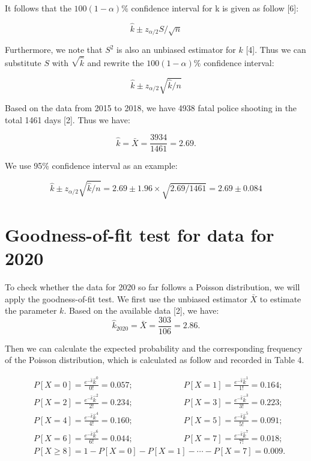 \documentclass[a4paper]{article}
\begin{document}
	It follows that the $100(1-\alpha)\%$ confidence interval for k is given as follow [6]:
	
	$$\hat{k}\pm z_{\alpha/2}S/\sqrt{n}$$
	
	Furthermore, we note that $S^2$ is also an unbiased estimator for $k$ [4]. Thus we can substitute $S$ with $\sqrt{\hat{k}}$ and rewrite the $100(1-\alpha)\%$ confidence interval:
	
	$$\hat{k}\pm z_{\alpha/2}\sqrt{\hat{k}/n}$$
	
	Based on the data from 2015 to 2018, we have 4938 fatal police shooting in the total 1461 days [2]. Thus we have:
	
	\begin{equation}
	\hat{k}=\bar{X}=\frac{3934}{1461}=2.69.
	\end{equation}

	We use 95\% confidence interval as an example:
	
	$$\hat{k}\pm z_{\alpha/2}\sqrt{\hat{k}/n}=2.69\pm1.96\times\sqrt{2.69/1461}=2.69\pm0.084$$
	
\section{Goodness-of-fit test for data for 2020}

    To check whether the data for 2020 so far follows a Poisson distribution, we will apply the goodness-of-fit test. We first use the unbiased estimator $\bar{X}$ to estimate the parameter $k$.
    Based on the available data [2], we have:
    \begin{equation}
    \hat{k}_{2020}=\bar{X}=\frac{303}{106}=2.86.
    \end{equation}
    
    Then we can calculate the expected probability and the corresponding frequency of the Poisson distribution, which is calculated as follow and recorded in Table 4. 
    
\begin{equation}
\begin{split}
&P[X=0]=\frac{e^{-\hat{k}}{\hat{k}}^0}{0!}=0.057; \qquad \qquad \qquad P[X=1]=\frac{e^{-\hat{k}}{\hat{k}}^1}{1!}=0.164;  \\
&P[X=2]=\frac{e^{-\hat{k}}{\hat{k}}^2}{2!}=0.234; \qquad \qquad \qquad P[X=3]=\frac{e^{-\hat{k}}{\hat{k}}^3}{3!}=0.223;  \\
&P[X=4]=\frac{e^{-\hat{k}}{\hat{k}}^4}{4!}=0.160; \qquad \qquad \qquad P[X=5]=\frac{e^{-\hat{k}}{\hat{k}}^5}{5!}=0.091;  \\
&P[X=6]=\frac{e^{-\hat{k}}{\hat{k}}^6}{6!}=0.044; \qquad \qquad \qquad P[X=7]=\frac{e^{-\hat{k}}{\hat{k}}^7}{7!}=0.018;  \\
&P[X\ge8]=1-P[X=0]-P[X=1]-\cdots-P[X=7]=0.009.
\nonumber
\end{split}
\end{equation}
    
\end{document}
